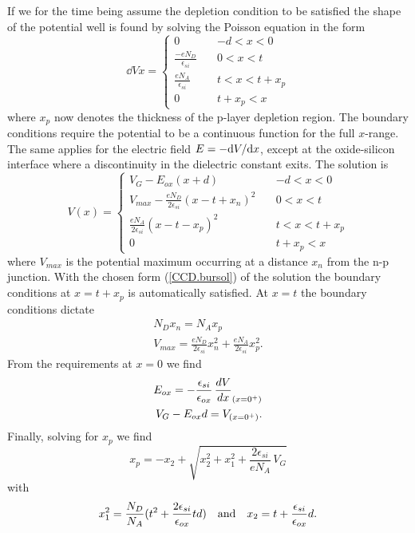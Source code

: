 If we for the time being assume the depletion condition to be
satisfied the shape of the potential well is found by solving the
Poisson equation in the form
\begin{equation}
  \dd{V}{x} = \left\{ \begin{array}{ll} 
	0 & -d < x < 0 \\
	\frac{\displaystyle -eN_D}{\displaystyle \epsilon_{si}} \quad &
	0 < x < t \\
	\frac{\displaystyle eN_A}{\displaystyle\epsilon_{si}} & 
	t < x < t+x_p \\
	0 & t+x_p < x
  \end{array} \right.
  \label{CCD.Poissonbur}
\end{equation}
where $x_p$ now denotes the thickness of the p-layer depletion
region. The boundary conditions require the potential to be a
continuous function for the full $x$-range. The same applies for the
electric field $E = -\mbox{d} V/\mbox{d} x$, except at the oxide-silicon
interface where a discontinuity in the dielectric constant exits.
The solution is
\begin{equation}
  V(x) = \left\{ \begin{array}{ll} 
	V_G-E_{ox}(x+d) & -d < x < 0 \\
	V_{max} - \frac{\displaystyle
	eN_D}{\displaystyle 2\epsilon_{si}} (x-t+x_n)^2 \quad & 
	0 < x < t \\ 
	\frac{\displaystyle eN_A}{\displaystyle
	2\epsilon_{si}}(x-t-x_p)^2 & t < x < t+x_p \\
	0 & t+x_p < x 
	\end{array} \right.
  \label{CCD.bursol}
\end{equation}
where $V_{max}$ is the potential maximum occurring at a distance $x_n$
from the n-p junction. With the chosen form (\ref{CCD.bursol}) of the
solution the boundary conditions at $x = t+x_p$ is automatically satisfied.
At $x = t$ the boundary conditions dictate
\begin{eqnarray}
  N_D x_n = N_A x_p 
	\label{CCD.xn} \\
  V_{max} = \frac{eN_D}{2\epsilon_{si}}x_n^2 +
	\frac{eN_A}{2\epsilon_{si}}x_p^2.
	\label{CCD.Vmax}
\end{eqnarray}
From the requirements at $x = 0$ we find
\begin{eqnarray}
  E_{ox} = - \frac{\epsilon_{si}}{\epsilon_{ox}} \, {d{V}\over{dx}}_{(x=0^+)} \\
  V_G - E_{ox}d = V_{(x=0^+)}.
  \label{CCD.VG}
\end{eqnarray}
Finally, solving for $x_p$ we find
\begin{equation}
  x_p = -x_2+\sqrt{x_2^2+x_1^2+\frac{2\epsilon_{si}}{eN_A} \, V_G}
  \label{CCD.xp}
\end{equation}
with
\begin{equation}
  x_1^2 = \frac{N_D}{N_A}(t^2+\frac{2\epsilon_{si}}{\epsilon_{ox}}td)
  \quad {\rm and} \quad
  x_2 = t+\frac{\epsilon_{si}}{\epsilon_{ox}}d.
  \label{CCD.x12}
\end{equation}

